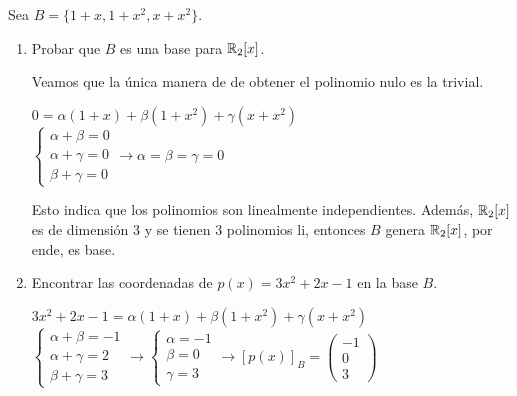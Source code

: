 \item Sea $B=\{1+x,1+x^2,x+x^2\}$.
    \begin{enumerate}
        \item Probar que $B$ es una base para $\mathbb{R}_2[x]$.
            \begin{mdframed}[style=s]
                Veamos que la única manera de de obtener el polinomio nulo es la trivial.
                \begin{center}
                    $0=\alpha(1+x)+\beta(1+x^2)+\gamma(x+x^2)$\\
                    $\begin{cases}
                        \alpha+\beta=0\\
                        \alpha+\gamma=0\\
                        \beta+\gamma=0
                    \end{cases}\to \alpha=\beta=\gamma=0$
                \end{center}
                Esto indica que los polinomios son linealmente independientes. Además, $\mathbb{R}_2[x]$ es de dimensión 3 y se tienen 3 polinomios li, entonces $B$ genera $\mathbb{R}_2[x]$, por ende, es base.
            \end{mdframed}
        \item Encontrar las coordenadas de $p(x)=3x^2+2x-1$ en la base $B$.
            \begin{mdframed}[style=s]
                \begin{center}
                    $3x^2+2x-1=\alpha(1+x)+\beta(1+x^2)+\gamma(x+x^2)$\\
                    $\begin{cases}
                        \alpha+\beta=-1\\
                        \alpha+\gamma=2\\
                        \beta+\gamma=3
                    \end{cases}\to\begin{cases}
                        \alpha=-1\\
                        \beta=0\\
                        \gamma=3
                    \end{cases}\to[p(x)]_B=\begin{pmatrix}
                        -1\\0\\3
                    \end{pmatrix}$
                \end{center}

\end{mdframed}
\end{enumerate}

